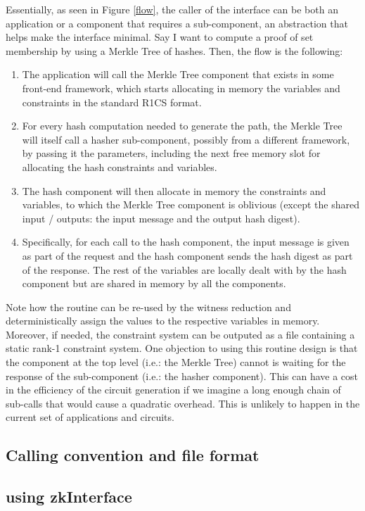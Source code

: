 Essentially, as seen in Figure \ref{flow}, the caller of the interface can be both an application or a component that requires a sub-component, an abstraction that helps make the interface minimal. Say I want to compute a proof of set membership by using a Merkle Tree of hashes. Then, the flow is the following:
\begin{enumerate} 
	\item The application will call the Merkle Tree component that exists in some front-end framework, which starts allocating in memory the variables and constraints in the standard R1CS format.
	\item For every hash computation needed to generate the path, the Merkle Tree will itself call a hasher sub-component, possibly from a different framework, by passing it the parameters, including the next free memory slot for allocating the hash constraints and variables.
	\item The hash component will then allocate in memory the constraints and variables, to which the Merkle Tree component is oblivious (except the shared input / outputs: the input message and the output hash digest).
	\item Specifically, for each call to the hash component, the input message is given as part of the request and the hash component sends the hash digest as part of the response. The rest of the variables are locally dealt with by the hash component but are shared in memory by all the components.
\end{enumerate}

Note how the routine can be re-used by the witness reduction and deterministically assign the values to the respective variables in memory. Moreover, if needed, the constraint system can be outputed as a file containing a static rank-1 constraint system. One objection to using this routine design is that the component at the top level (i.e.: the Merkle Tree) cannot is waiting for the response of the sub-component (i.e.: the hasher component). This can have a cost in the efficiency of the circuit generation if we imagine a long enough chain of sub-calls that would cause a quadratic overhead. This is unlikely to happen in the current set of applications and circuits. 
	

\subsection{Calling convention and file format}



\subsection{using zkInterface}

